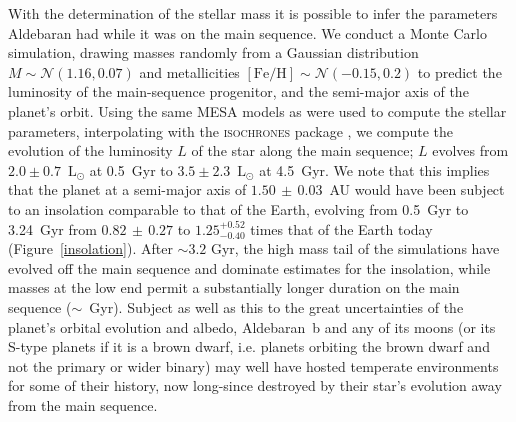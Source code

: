 \documentclass[modern]{aastex61}
\newcommand{\lsun}{\mbox{$\mathrm{L}_{\odot}$}\xspace}
\begin{document}
With the determination of the stellar mass it is possible to infer the parameters Aldebaran had while it was on the main sequence. We conduct a Monte Carlo simulation, drawing masses randomly from a Gaussian distribution $M \sim \mathcal{N}(1.16,0.07)$ and metallicities $[\text{Fe}/\text{H}] \sim \mathcal{N}(-0.15,0.2)$ \citep{decin2003} to predict the luminosity of the main-sequence progenitor, and the semi-major axis of the planet's orbit.
Using the same \citet{2017Rod} MESA models as were used to compute the stellar parameters, interpolating with the \textsc{isochrones} package \citep{isochrones}, we compute the evolution of the luminosity $L$ of the star along the main sequence; $L$ evolves from $2.0 \pm 0.7$~\lsun at 0.5~Gyr to $3.5 \pm 2.3$~\lsun at 4.5~Gyr.
We note that this implies that the planet at a semi-major axis of $1.50\, \pm\, 0.03$~AU would have been subject to an insolation comparable to that of the Earth, evolving from 0.5~Gyr to 3.24~Gyr from $0.82\, \pm\, 0.27$ to $1.25^{+0.52}_{-0.40}$ times that of the Earth today (Figure~\ref{insolation}). After $\sim 3.2$ Gyr, the high mass tail of the simulations have evolved off the main sequence and dominate estimates for the insolation, while masses at the low end permit a substantially longer duration on the main sequence ($\sim$~Gyr). Subject as well as this to the great uncertainties of the planet's orbital evolution and albedo, Aldebaran~b and any of its moons (or its S-type planets if it is a brown dwarf, i.e. planets orbiting the brown dwarf and not the primary or wider binary) may well have hosted temperate environments for some of their history, now long-since destroyed by their star's evolution away from the main sequence.
\end{document}
